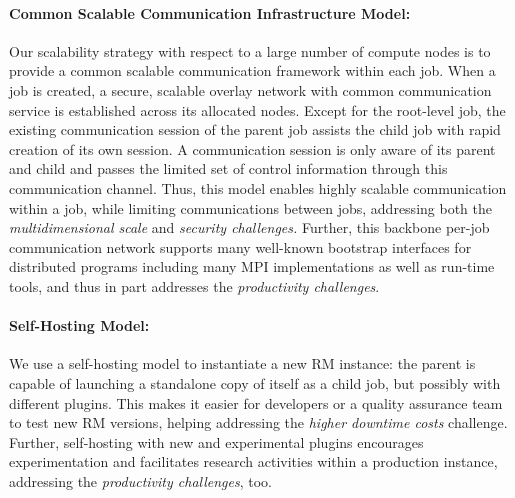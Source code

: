 \documentclass[10pt]{article}
\begin{document}
\paragraph{Common Scalable Communication Infrastructure Model:}
Our scalability strategy with respect to a large number of compute nodes 
is to provide a common scalable communication framework within each
job. When a job is created, a secure, scalable overlay network with common
communication service is established across its allocated nodes.
Except for the root-level job, the existing communication session of the
parent job assists the child job with rapid creation of its own session.
A communication session is only aware of its parent and child and passes
the limited set of control information through this communication channel.
Thus, this model enables highly scalable communication within a job, 
while limiting communications between jobs, addressing both the 
{\sl multidimensional scale} and {\sl security challenges.} 
Further, this backbone per-job communication network supports 
many well-known bootstrap interfaces for distributed programs including
many MPI implementations as well as run-time tools, and thus in part
addresses the {\sl productivity challenges}. 


\paragraph{Self-Hosting Model:}
We use a self-hosting model to instantiate a new RM instance: the parent
is capable of launching a standalone copy of itself as a child job, but possibly
with different plugins. 
This makes it easier for developers or a quality assurance team to test new RM versions,
helping addressing the {\sl higher downtime costs} challenge. 
Further, self-hosting with new and experimental plugins 
encourages experimentation and facilitates research activities 
within a production instance, addressing the {\sl productivity challenges}, too.
\end{document}

